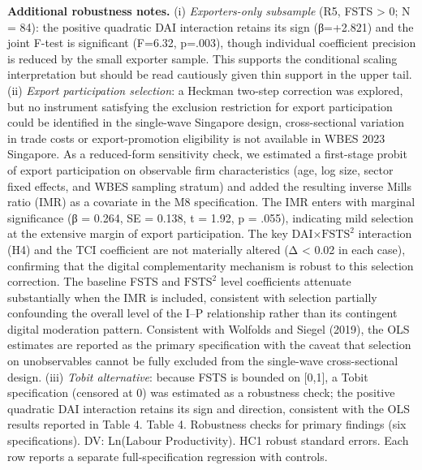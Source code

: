 \documentclass[12pt,a4paper]{article}
\begin{document}
\textbf{Additional robustness notes.} (i) \emph{Exporters-only
subsample} (R5, FSTS \textgreater{} 0; N = 84): the positive quadratic
DAI interaction retains its sign (β=+2.821) and the joint F-test is
significant (F=6.32, p=.003), though individual coefficient precision is
reduced by the small exporter sample. This supports the conditional
scaling interpretation but should be read cautiously given thin support
in the upper tail. (ii) \emph{Export participation selection}: a Heckman
two-step correction was explored, but no instrument satisfying the
exclusion restriction for export participation could be identified in
the single-wave Singapore design, cross-sectional variation in trade
costs or export-promotion eligibility is not available in WBES 2023
Singapore. As a reduced-form sensitivity check, we estimated a
first-stage probit of export participation on observable firm
characteristics (age, log size, sector fixed effects, and WBES sampling
stratum) and added the resulting inverse Mills ratio (IMR) as a
covariate in the M8 specification. The IMR enters with marginal
significance (β = 0.264, SE = 0.138, t = 1.92, p = .055), indicating
mild selection at the extensive margin of export participation. The key
DAI×\(\mathrm{FSTS}^2\) interaction (H4) and the TCI coefficient are not
materially altered (\textbar Δ\textbar{} \textless{} 0.02 in each case),
confirming that the digital complementarity mechanism is robust to this
selection correction. The baseline FSTS and \(\mathrm{FSTS}^2\) level
coefficients attenuate substantially when the IMR is included,
consistent with selection partially confounding the overall level of the
I--P relationship rather than its contingent digital moderation pattern.
Consistent with Wolfolds and Siegel (2019), the OLS estimates are
reported as the primary specification with the caveat that selection on
unobservables cannot be fully excluded from the single-wave
cross-sectional design. (iii) \emph{Tobit alternative}: because FSTS is
bounded on {[}0,1{]}, a Tobit specification (censored at 0) was
estimated as a robustness check; the positive quadratic DAI interaction
retains its sign and direction, consistent with the OLS results reported
in Table 4. Table 4. Robustness checks for primary findings (six
specifications). DV: Ln(Labour Productivity). HC1 robust standard
errors. Each row reports a separate full-specification regression with
controls.
\end{document}
